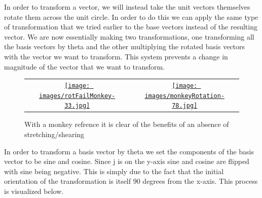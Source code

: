 In order to transform a vector, we will instead take the unit vectors themselves rotate them across the unit circle. In order to do this we can apply the same type of transformation that we tried earlier to the base vectors instead of the resulting vector. We are now essentially making two transformations, one transforming all the basis vectors by theta and the other multiplying the rotated basis vectors with the vector we want to transform. This system prevents a change in magnitude of the vector that we want to transform.

\begin{figure}[ht]\centering %
\begin{tabular}{ c c }
	\href{https://raw.githubusercontent.com/beastr45/MathIA-bear/main/latex/Figures/images/gifs/rotFailMonkey.gif}{\texttt{[image: images/rotFailMonkey-33.jpg]}} & \href{https://raw.githubusercontent.com/beastr45/MathIA-bear/main/latex/Figures/images/gifs/monkeyRotation.gif}{\texttt{[image: images/monkeyRotation-78.jpg]}}
\end{tabular}
	\caption{With a monkey refrence it is clear of the benefits of an absence of stretching/shearing}
	\label{fig:monkeyGif}
\end{figure}

In order to transform a basis vector by theta we set the components of the basis vector to be sine and cosine. Since j is on the y-axis sine and cosine are flipped with sine being negative. This is simply due to the fact that the initial orientation of the transformation is itself 90 degrees from the x-axis. This process is visualized below. 

